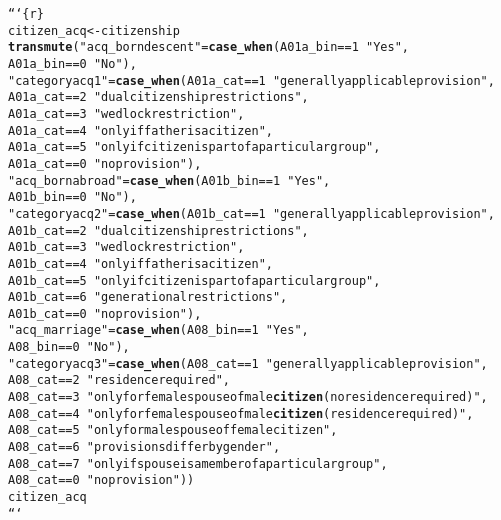 \documentclass{article}\usepackage[]{graphicx}\usepackage[]{xcolor}
\makeatletter
\newcommand{\hlstr}[1]{\textcolor[rgb]{0.192,0.494,0.8}{#1}}%
\newcommand{\hlkwd}[1]{\textcolor[rgb]{0.737,0.353,0.396}{\textbf{#1}}}%
\newenvironment{kframe}{%
 \def\at@end@of@kframe{}%
 \ifinner\ifhmode%
  \def\at@end@of@kframe{\end{minipage}}%
  \begin{minipage}{\columnwidth}%
 \fi\fi%
 \def\FrameCommand##1{\hskip\@totalleftmargin \hskip-\fboxsep
 \colorbox{shadecolor}{##1}\hskip-\fboxsep
     \hskip-\linewidth \hskip-\@totalleftmargin \hskip\columnwidth}%
 \MakeFramed {\advance\hsize-\width
   \@totalleftmargin\z@ \linewidth\hsize
   \@setminipage}}%
 {\par\unskip\endMakeFramed%
 \at@end@of@kframe}
\newenvironment{knitrout}{}{} %
\makeatother
\begin{document}
\begin{knitrout}
\begin{kframe}
\begin{alltt}
```\{r\}
citizen_acq <- citizenship %>%
  \hlkwd{transmute}(\hlstr{"acq_borndescent"} = \hlkwd{case_when}(A01a_bin == 1 ~ \hlstr{"Yes"},
                                          A01a_bin == 0 ~ \hlstr{"No"}),
            \hlstr{"categoryacq1"} = \hlkwd{case_when}(A01a_cat == 1 ~ \hlstr{"generally applicable provision"},
                                       A01a_cat == 2 ~ \hlstr{"dual citizenship restrictions"},
                                       A01a_cat == 3 ~ \hlstr{"wedlock restriction"},
                                       A01a_cat == 4 ~ \hlstr{"only if father is a citizen"},
                                       A01a_cat == 5 ~ \hlstr{"only if citizen is part of a particular group"},
                                       A01a_cat == 0 ~ \hlstr{"no provision"}),
            \hlstr{"acq_bornabroad"} = \hlkwd{case_when}(A01b_bin == 1 ~ \hlstr{"Yes"},
                                         A01b_bin == 0 ~ \hlstr{"No"}),
            \hlstr{"categoryacq2"} = \hlkwd{case_when}(A01b_cat == 1 ~ \hlstr{"generally applicable provision"},
                                       A01b_cat == 2 ~ \hlstr{"dual citizenship restrictions"},
                                       A01b_cat == 3 ~ \hlstr{"wedlock restriction"},
                                       A01b_cat == 4 ~ \hlstr{"only if father is a citizen"},
                                       A01b_cat == 5 ~ \hlstr{"only if citizen is part of a particular group"},
                                       A01b_cat == 6 ~ \hlstr{"generational restrictions"},
                                       A01b_cat == 0 ~ \hlstr{"no provision"}),
            \hlstr{"acq_marriage"} = \hlkwd{case_when}(A08_bin == 1 ~ \hlstr{"Yes"},
                                       A08_bin == 0 ~ \hlstr{"No"}),
            \hlstr{"categoryacq3"} = \hlkwd{case_when}(A08_cat == 1 ~ \hlstr{"generally applicable provision"},
                                       A08_cat == 2 ~ \hlstr{"residence required"},
                                       A08_cat == 3 ~ \hlstr{"only for female spouse of male \hlkwd{citizen} (no residence required)"},
                                       A08_cat == 4 ~ \hlstr{"only for female spouse of male \hlkwd{citizen} (residence required)"},
                                       A08_cat == 5 ~ \hlstr{"only for male spouse of female citizen"},
                                       A08_cat == 6 ~ \hlstr{"provisions differ by gender"},
                                       A08_cat == 7 ~ \hlstr{"only if spouse is a member of a particular group"},
                                       A08_cat == 0 ~ \hlstr{"no provision"}))
citizen_acq
```


\end{alltt}
\end{kframe}
\end{knitrout}
\end{document}
